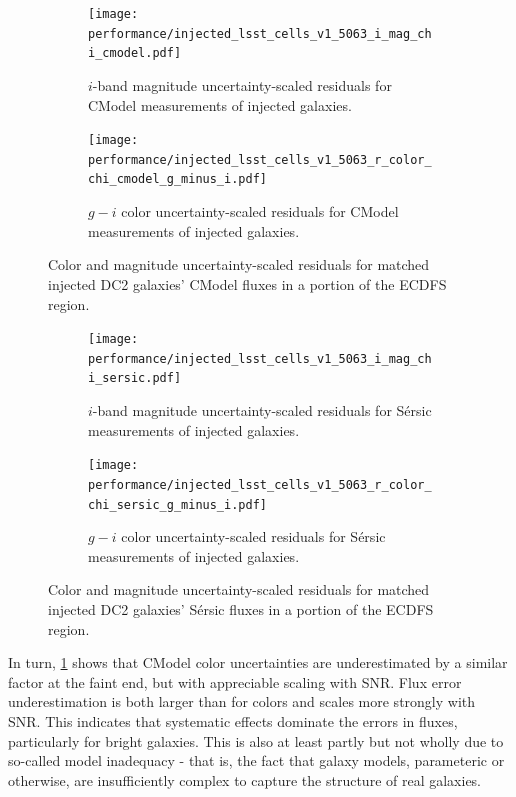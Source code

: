 \begin{figure}[hbt!]
  \centering
  \begin{subfigure}[t]{0.45\textwidth}
  \texttt{[image: performance/injected\_lsst\_cells\_v1\_5063\_i\_mag\_chi\_cmodel.pdf]}
  \caption{$i$-band magnitude uncertainty-scaled residuals for CModel measurements of injected galaxies.}
  \end{subfigure}\hfill
  \begin{subfigure}[t]{0.45\textwidth}
  \texttt{[image: performance/injected\_lsst\_cells\_v1\_5063\_r\_color\_chi\_cmodel\_g\_minus\_i.pdf]}
  \caption{$g-i$ color uncertainty-scaled residuals for CModel measurements of injected galaxies.}
  \end{subfigure}\hfill
\caption{Color and magnitude uncertainty-scaled residuals for matched injected DC2 galaxies' CModel fluxes in a portion of the \gls{ECDFS} region.}
\label{fig:injected_lsst_cells_v1_5063_galaxy_cmodel_chi}
\vspace{0.1cm}
\end{figure}

\begin{figure}[hbt!]
  \centering
  \begin{subfigure}[t]{0.45\textwidth}
  \texttt{[image: performance/injected\_lsst\_cells\_v1\_5063\_i\_mag\_chi\_sersic.pdf]}
  \caption{$i$-band magnitude uncertainty-scaled residuals for S\'ersic measurements of injected galaxies.}
  \end{subfigure}\hfill
  \begin{subfigure}[t]{0.45\textwidth}
  \texttt{[image: performance/injected\_lsst\_cells\_v1\_5063\_r\_color\_chi\_sersic\_g\_minus\_i.pdf]}
  \caption{$g-i$ color uncertainty-scaled residuals for S\'ersic measurements of injected galaxies.}
  \end{subfigure}\hfill
\caption{Color and magnitude uncertainty-scaled residuals for matched injected DC2 galaxies' S\'ersic fluxes in a portion of the \gls{ECDFS} region.}
\label{fig:injected_lsst_cells_v1_5063_galaxy_sersic_chi}
\vspace{0.1cm}
\end{figure}

In turn, \ref{fig:injected_lsst_cells_v1_5063_galaxy_cmodel_chi} shows that CModel color uncertainties are underestimated by a similar factor at the faint end, but with appreciable scaling with \gls{SNR}.
Flux error underestimation is both larger than for colors and scales more strongly with \gls{SNR}.
This indicates that systematic effects dominate the errors in fluxes, particularly for bright galaxies.
This is also at least partly but not wholly due to so-called model inadequacy - that is, the fact that galaxy models, parameteric or otherwise, are insufficiently complex to capture the structure of real galaxies.

